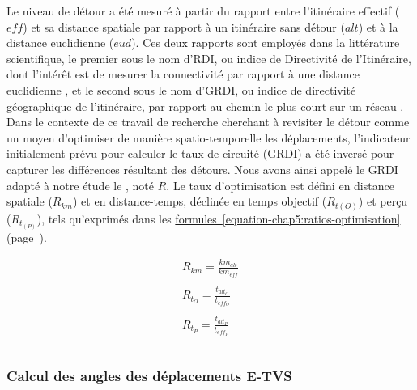 \begin{refsegment}
Le niveau de détour a été mesuré à partir du rapport entre l'itinéraire effectif (\(eff\)) et sa distance spatiale par rapport à un itinéraire sans détour (\(alt\)) et à la distance euclidienne (\(eud\)). Ces deux rapports sont employés dans la littérature scientifique, le premier sous le nom d'\acrfull{RDI}, ou indice de Directivité de l'Itinéraire, dont l'intérêt est de mesurer la connectivité par rapport à une distance euclidienne \textcolor{blue}{\autocite[193]{park_why_2019}}, et le second sous le nom d'\acrfull{GRDI}, ou indice de directivité géographique de l'itinéraire, par rapport au chemin le plus court sur un réseau \textcolor{blue}{\autocite[126]{ciscal-terry_analysis_2016}}. Dans le contexte de ce travail de recherche cherchant à revisiter le détour comme un moyen d'optimiser de manière spatio-temporelle les déplacements, l'indicateur initialement prévu pour calculer le taux de circuité (\acrshort{GRDI}) a été inversé pour capturer les différences résultant des détours. Nous avons ainsi appelé le \acrshort{GRDI} adapté à notre étude le , noté \(R\). Le taux d'optimisation est défini en distance spatiale (\(R_{km}\)) et en distance-temps, déclinée en temps objectif (\(R_{t{(O)}}\)) et perçu (\(R_{t_{(P)}}\)), tels qu'exprimés dans les \hyperref[equation-chap5:ratios-optimisation]{formules~\ref{equation-chap5:ratios-optimisation}} (page~\pageref{equation-chap5:ratios-optimisation}).%

    \begin{equation}
    \label{equation-chap5:ratios-optimisation}
    \begin{array}{lclcl}
    \displaystyle R_{km} = \displaystyle\frac{km_{alt}}{km_{eff}}\\\\
    \displaystyle R_{t_O} = \displaystyle\frac{t_{alt_O}}{t_{eff_O}}\\\\
    \displaystyle R_{t_P} = \displaystyle\frac{t_{alt_P}}{t_{eff_P}}\\\\
    \end{array}
    \end{equation}

\subsubsection*{Calcul des angles des déplacements \acrshort{E-TVS}
    \label{chap5:calcul-angles-detours}
    }


\end{refsegment}
